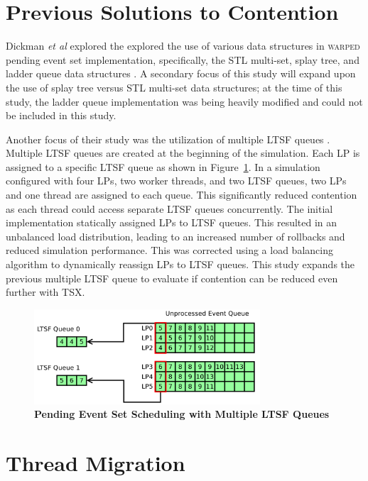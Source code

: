 \documentclass[11pt]{book}
\begin{document}
\section{Previous Solutions to Contention}

Dickman \emph{et al} explored the explored the use of various data structures in \textsc{warped}
pending event set implementation, specifically, the STL multi-set, splay tree, and ladder
queue data structures \cite{dickman}.  A secondary focus of this study will expand upon
the use of splay tree versus STL multi-set data structures; at the time of this study, the
ladder queue implementation was being heavily modified and could not be included in this
study.

Another focus of their study was the utilization of multiple LTSF queues \cite{dickman}.
Multiple LTSF queues are created at the beginning of the simulation.  Each LP is assigned
to a specific LTSF queue as shown in Figure~\ref{fig:multipleLTSF}.  In a simulation
configured with four LPs, two worker threads, and two LTSF queues, two LPs and one thread
are assigned to each queue.  This significantly reduced contention as each thread could
access separate LTSF queues concurrently.  The initial implementation statically assigned
LPs to LTSF queues.  This resulted in an unbalanced load distribution, leading to an
increased number of rollbacks and reduced simulation performance.  This was corrected
using a load balancing algorithm to dynamically reassign LPs to LTSF queues.  This study
expands the previous multiple LTSF queue to evaluate if contention can be reduced even
further with TSX.

\begin{figure}[H]
    \centering
    \graphicspath{ {./figures/} }
    \includegraphics[width=0.75\textwidth,keepaspectratio]{multiple_ltsf}
    \caption{\textbf{Pending Event Set Scheduling with Multiple LTSF Queues}}
    \label{fig:multipleLTSF}
\end{figure}

\section{Thread Migration}
\end{document}

